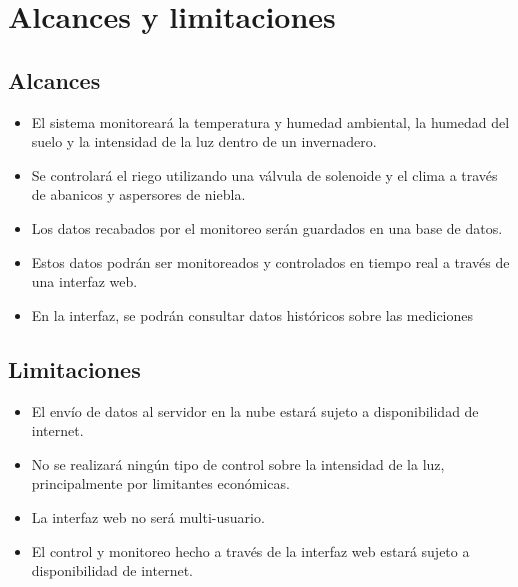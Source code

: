\section{Alcances y limitaciones}

\subsection*{Alcances}
\begin{itemize}
    \item El sistema monitoreará la temperatura y humedad ambiental, la humedad del suelo y la intensidad de la luz dentro de un invernadero.
    \item Se controlará el riego utilizando una válvula de solenoide y el clima a través de abanicos y aspersores de niebla. 
    \item Los datos recabados por el monitoreo serán guardados en una base de datos.
    \item Estos datos podrán ser monitoreados y controlados en tiempo real a través de una interfaz web.
    \item En la interfaz, se podrán consultar datos históricos sobre las mediciones
\end{itemize}

\subsection*{Limitaciones}
\begin{itemize}
    \item El envío de datos al servidor en la nube estará sujeto a disponibilidad de internet.
    \item No se realizará ningún tipo de control sobre la intensidad de la luz, principalmente por limitantes económicas.
    \item La interfaz web no será multi-usuario.
    \item El control y monitoreo hecho a través de la interfaz web estará sujeto a disponibilidad de internet.
\end{itemize}
